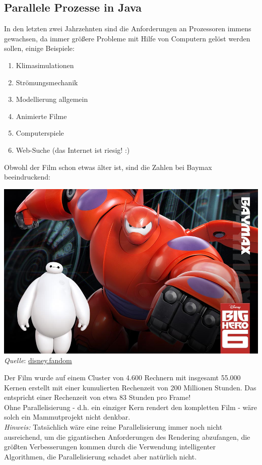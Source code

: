 \documentclass{article}
\begin{document}
\subsection{Parallele Prozesse in Java}

In den letzten zwei Jahrzehnten sind die Anforderungen an Prozessoren immens gewachsen, da immer größere Probleme mit Hilfe von Computern gelöst werden sollen, einige Beispiele:
\begin{enumerate}
    \item Klimasimulationen
    \item Strömungsmechanik
    \item Modellierung allgemein
    \item Animierte Filme
    \item Computerspiele
    \item Web-Suche (das Internet ist riesig! :)
\end{enumerate}
\newpage
Obwohl der Film schon etwas älter ist, sind die Zahlen bei Baymax beeindruckend:
\begin{center}
    \includegraphics[scale=1.1]{../../media/baymax.png} \\
    \textit{Quelle}: \href{https://disney.fandom.com/wiki/Big_Hero_6/Gallery}{disney.fandom} 
\end{center}
Der Film wurde auf einem Cluster von 4.600 Rechnern mit insgesamt 55.000 Kernen erstellt mit einer kumulierten Rechenzeit von 200 Millionen Stunden. Das entspricht einer Rechenzeit von etwa 83 Stunden pro Frame! \\
Ohne Parallelisierung - d.h. ein einziger Kern rendert den kompletten Film - wäre solch ein Mammutprojekt nicht denkbar. \\
\textit{Hinweis:} Tatsächlich wäre eine reine Parallelisierung immer noch nicht ausreichend, um die gigantischen Anforderungen des Rendering abzufangen, die größten Verbesserungen kommen durch die Verwendung intelligenter Algorithmen, die Parallelisierung schadet aber natürlich nicht. \\
\end{document}
